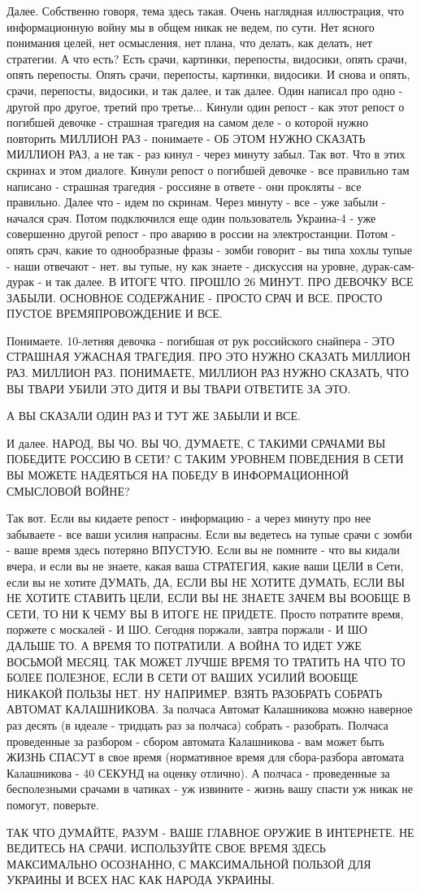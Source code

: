Далее. Собственно говоря, тема здесь такая. Очень наглядная иллюстрация, что
информационную войну мы в общем никак не ведем, по сути. Нет ясного понимания
целей, нет осмысления, нет плана, что делать, как делать, нет стратегии. А что
есть? Есть срачи, картинки, перепосты, видосики, опять срачи, опять перепосты.
Опять срачи, перепосты, картинки, видосики. И снова и опять, срачи, перепосты,
видосики, и так далее, и так далее. Один написал про одно - другой про другое,
третий про третье... Кинули один репост - как этот репост о погибшей девочке -
страшная трагедия на самом деле - о которой нужно повторить МИЛЛИОН РАЗ -
понимаете - ОБ ЭТОМ НУЖНО СКАЗАТЬ МИЛЛИОН РАЗ, а не так - раз кинул - через
минуту забыл. Так вот. Что в этих скринах и этом диалоге. Кинули репост о
погибшей девочке - все правильно там написано - страшная трагедия - россияне в
ответе - они прокляты - все правильно. Далее что - идем по скринам. Через
минуту - все - уже забыли - начался срач. Потом подключился еще один
пользователь Украина-4 - уже совершенно другой репост - про аварию в россии на
электростанции. Потом - опять срач, какие то однообразные фразы - зомби говорит
- вы типа хохлы тупые - наши отвечают - нет. вы тупые, ну как знаете -
дискуссия на уровне, дурак-сам-дурак - и так далее. В ИТОГЕ ЧТО. ПРОШЛО 26
МИНУТ. ПРО ДЕВОЧКУ ВСЕ ЗАБЫЛИ. ОСНОВНОЕ СОДЕРЖАНИЕ - ПРОСТО СРАЧ И ВСЕ. ПРОСТО
ПУСТОЕ ВРЕМЯПРОВОЖДЕНИЕ И ВСЕ. 

Понимаете. 10-летняя девочка - погибшая от рук российского снайпера - ЭТО
СТРАШНАЯ УЖАСНАЯ ТРАГЕДИЯ. ПРО ЭТО НУЖНО СКАЗАТЬ МИЛЛИОН РАЗ. МИЛЛИОН РАЗ.
ПОНИМАЕТЕ, МИЛЛИОН РАЗ НУЖНО СКАЗАТЬ, ЧТО ВЫ ТВАРИ УБИЛИ ЭТО ДИТЯ И ВЫ ТВАРИ
ОТВЕТИТЕ ЗА ЭТО.


А ВЫ СКАЗАЛИ ОДИН РАЗ И ТУТ ЖЕ ЗАБЫЛИ И ВСЕ.

И далее. НАРОД, ВЫ ЧО. ВЫ ЧО, ДУМАЕТЕ, С ТАКИМИ СРАЧАМИ ВЫ ПОБЕДИТЕ РОССИЮ В
СЕТИ? С ТАКИМ УРОВНЕМ ПОВЕДЕНИЯ В СЕТИ ВЫ МОЖЕТЕ НАДЕЯТЬСЯ НА ПОБЕДУ В
ИНФОРМАЦИОННОЙ СМЫСЛОВОЙ ВОЙНЕ?

Так вот. Если вы кидаете репост - информацию - а через минуту про нее забываете
- все ваши усилия напрасны. Если вы ведетесь на тупые срачи с зомби - ваше
время здесь потеряно ВПУСТУЮ. Если вы не помните - что вы кидали вчера, и если
вы не знаете, какая ваша СТРАТЕГИЯ, какие ваши ЦЕЛИ в Сети, если вы не хотите
ДУМАТЬ, ДА, ЕСЛИ ВЫ НЕ ХОТИТЕ ДУМАТЬ, ЕСЛИ ВЫ НЕ ХОТИТЕ СТАВИТЬ ЦЕЛИ, ЕСЛИ ВЫ
НЕ ЗНАЕТЕ ЗАЧЕМ ВЫ ВООБЩЕ В СЕТИ, ТО НИ К ЧЕМУ ВЫ В ИТОГЕ НЕ ПРИДЕТЕ. Просто
потратите время, поржете с москалей - И ШО. Сегодня поржали, завтра поржали - И
ШО ДАЛЬШЕ ТО. А ВРЕМЯ ТО ПОТРАТИЛИ. А ВОЙНА ТО ИДЕТ УЖЕ ВОСЬМОЙ МЕСЯЦ. ТАК
МОЖЕТ ЛУЧШЕ ВРЕМЯ ТО ТРАТИТЬ НА ЧТО ТО БОЛЕЕ ПОЛЕЗНОЕ, ЕСЛИ В СЕТИ ОТ ВАШИХ
УСИЛИЙ ВООБЩЕ НИКАКОЙ ПОЛЬЗЫ НЕТ. НУ НАПРИМЕР.  ВЗЯТЬ РАЗОБРАТЬ СОБРАТЬ АВТОМАТ
КАЛАШНИКОВА. За полчаса Автомат Калашникова можно наверное раз десять (в идеале
- тридцать раз за полчаса) собрать - разобрать.  Полчаса проведенные за
разбором - сбором автомата Калашникова - вам может быть ЖИЗНЬ СПАСУТ в свое
время (нормативное время для сбора-разбора автомата Калашникова - 40 СЕКУНД на
оценку отлично). А полчаса - проведенные за бесполезными срачами в чатиках - уж
извините - жизнь вашу спасти уж никак не помогут, поверьте.

ТАК ЧТО ДУМАЙТЕ, РАЗУМ - ВАШЕ ГЛАВНОЕ ОРУЖИЕ В ИНТЕРНЕТЕ.  НЕ ВЕДИТЕСЬ НА
СРАЧИ. ИСПОЛЬЗУЙТЕ СВОЕ ВРЕМЯ ЗДЕСЬ МАКСИМАЛЬНО ОСОЗНАННО, С МАКСИМАЛЬНОЙ
ПОЛЬЗОЙ ДЛЯ УКРАИНЫ И ВСЕХ НАС КАК НАРОДА УКРАИНЫ.
